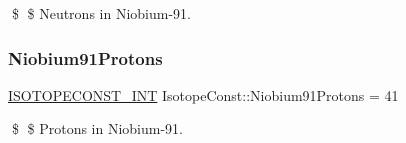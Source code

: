 \$ \$ Neutrons in Niobium-\/91. \mbox{\label{group___isotope_const-_niobium-_nb91_ga32aac9d658980f3c5149031f450be3b6}} 
\subsubsection{\texorpdfstring{Niobium91\+Protons}{Niobium91Protons}}
{\footnotesize\ttfamily \mbox{\hyperlink{group___isotope_const-_macros_ga5f18360b3e99483a35c32d789e62621c}{I\+S\+O\+T\+O\+P\+E\+C\+O\+N\+S\+T\+\_\+\+I\+NT}} Isotope\+Const\+::\+Niobium91\+Protons = 41}

\$ \$ Protons in Niobium-\/91. 